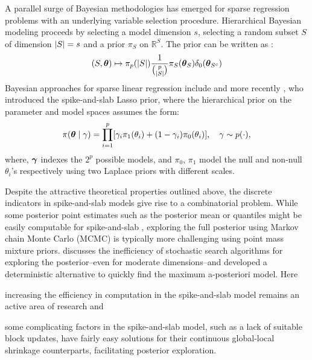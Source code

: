 \documentclass[11pt]{article}
\begin{document}
A parallel surge of Bayesian methodologies has emerged for sparse regression
problems with an underlying variable selection procedure. Hierarchical Bayesian
modeling proceeds by selecting a model dimension $s$, selecting a random subset
$S$ of dimension $\lvert S\rvert = s$ and a prior $\pi_S$ on $\mathbb{R}^{S}$. The
prior can be written as \cite{castillo2015bayesian}:
\begin{equation}
  (S,\boldsymbol{\theta}) \mapsto \pi_p(\lvert S\rvert) \frac{1}{\binom{p}{\lvert S\rvert}}
  \pi_S(\boldsymbol{\theta}_S)\delta_{0}(\boldsymbol{\theta}_{S^c}) \label{eq:bayes-hier}
\end{equation}
Bayesian approaches for sparse linear regression include
\citep{george2000variable,George0000, mitchell88, ishwaran2005spike} and more
recently \cite{rovckova2016spike}, who introduced the spike-and-slab Lasso
prior, where the hierarchical prior on the parameter and model spaces assumes
the form:
\begin{equation}
  \pi(\boldsymbol{\theta} \mid \gamma) = \prod_{i=1}^{p} [\gamma_i \pi_1(\theta_i) +
  (1-\gamma_i) \pi_0(\theta_i)], \quad \gamma \sim p(\cdot), \label{eq:ssl}
\end{equation}
where, $\boldsymbol{\gamma}$ indexes the $2^p$ possible models, and $\pi_0$, $\pi_1$ model
the null and non-null $\theta_i$'s respectively using two Laplace priors with
different scales. 

Despite the attractive theoretical properties outlined above, the discrete
indicators in spike-and-slab models give rise to a combinatorial problem. While
some posterior point estimates such as the posterior mean or quantiles might be
easily computable for spike-and-slab \citep{castillo2012needles,
castillo2015bayesian}, exploring the full posterior using Markov chain Monte
Carlo (MCMC) is typically more challenging using point mass mixture priors. 
\citet{rovckova2016spike} discusses the inefficiency of stochastic search
algorithms for exploring the posterior--even for moderate dimensions--and
developed a deterministic alternative to quickly find the maximum a-posteriori
model. Here 
\begin{enumerate*}
  \item increasing the efficiency in computation in the spike-and-slab model
    remains an active area of research \citep[see, e.g., ][]{rovckova2016spike}
    and
  \item some complicating factors in the spike-and-slab model, such as a lack
    of suitable block updates, have fairly easy solutions for their continuous
    global-local shrinkage counterparts, facilitating posterior exploration. 
\end{enumerate*}
\end{document}
